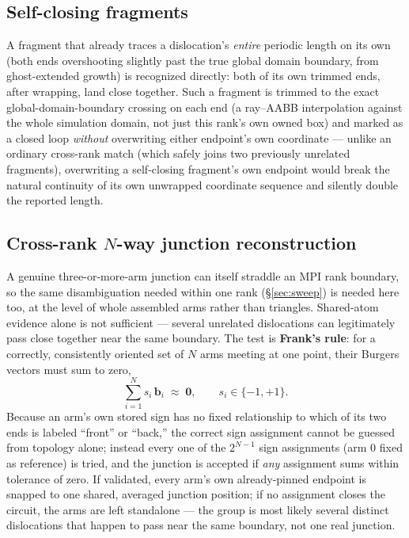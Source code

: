 \documentclass[11pt,a4paper]{article}
\newcommand{\vb}[1]{\boldsymbol{#1}}
\begin{document}
\subsection{Self-closing fragments}

A fragment that already traces a dislocation's \emph{entire} periodic length on its own (both ends
overshooting slightly past the true global domain boundary, from ghost-extended growth) is
recognized directly: both of its own trimmed ends, after wrapping, land close together. Such a
fragment is trimmed to the exact global-domain-boundary crossing on each end (a ray–AABB
interpolation against the whole simulation domain, not just this rank's own owned box) and marked
as a closed loop \emph{without} overwriting either endpoint's own coordinate — unlike an ordinary
cross-rank match (which safely joins two previously unrelated fragments), overwriting a
self-closing fragment's own endpoint would break the natural continuity of its own unwrapped
coordinate sequence and silently double the reported length.

\subsection{Cross-rank $N$-way junction reconstruction}

A genuine three-or-more-arm junction can itself straddle an MPI rank boundary, so the same
disambiguation needed within one rank (\S\ref{sec:sweep}) is needed here too, at the level of
whole assembled arms rather than triangles. Shared-atom evidence alone is not sufficient — several
unrelated dislocations can legitimately pass close together near the same boundary. The test is
\textbf{Frank's rule}: for a correctly, consistently oriented set of $N$ arms meeting at one point,
their Burgers vectors must sum to zero,
\begin{equation}
  \sum_{i=1}^{N} s_i\,\vb{b}_i \;\approx\; \vb{0}, \qquad s_i \in \{-1,+1\}.
\end{equation}
Because an arm's own stored sign has no fixed relationship to which of its two ends is labeled
``front'' or ``back,'' the correct sign assignment cannot be guessed from topology alone; instead
every one of the $2^{N-1}$ sign assignments (arm 0 fixed as reference) is tried, and the junction
is accepted if \emph{any} assignment sums within tolerance of zero. If validated, every arm's own
already-pinned endpoint is snapped to one shared, averaged junction position; if no assignment
closes the circuit, the arms are left standalone — the group is most likely several distinct
dislocations that happen to pass near the same boundary, not one real junction.
\end{document}

